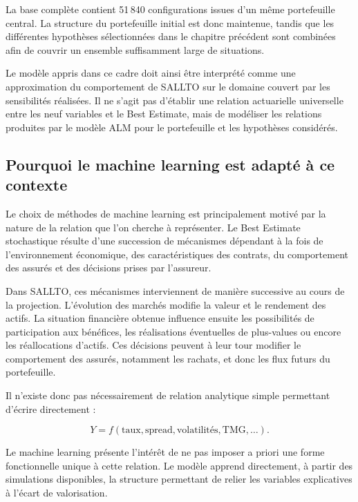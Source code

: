 La base complète contient 51\,840 configurations issues d'un même portefeuille central. La structure du portefeuille initial est donc maintenue, tandis que les différentes hypothèses sélectionnées dans le chapitre précédent sont combinées afin de couvrir un ensemble suffisamment large de situations.

Le modèle appris dans ce cadre doit ainsi être interprété comme une approximation du comportement de SALLTO sur le domaine couvert par les sensibilités réalisées. Il ne s'agit pas d'établir une relation actuarielle universelle entre les neuf variables et le Best Estimate, mais de modéliser les relations produites par le modèle ALM pour le portefeuille et les hypothèses considérés.


\subsection{Pourquoi le machine learning est adapté à ce contexte}

Le choix de méthodes de machine learning est principalement motivé par la nature de la relation que l'on cherche à représenter. Le Best Estimate stochastique résulte d'une succession de mécanismes dépendant à la fois de l'environnement économique, des caractéristiques des contrats, du comportement des assurés et des décisions prises par l'assureur.

Dans SALLTO, ces mécanismes interviennent de manière successive au cours de la projection. L'évolution des marchés modifie la valeur et le rendement des actifs. La situation financière obtenue influence ensuite les possibilités de participation aux bénéfices, les réalisations éventuelles de plus-values ou encore les réallocations d'actifs. Ces décisions peuvent à leur tour modifier le comportement des assurés, notamment les rachats, et donc les flux futurs du portefeuille.

Il n'existe donc pas nécessairement de relation analytique simple permettant d'écrire directement :

\begin{equation}
    Y =
    f(
    \text{taux},
    \text{spread},
    \text{volatilités},
    \text{TMG},
    \ldots
    ).
\end{equation}

Le machine learning présente l'intérêt de ne pas imposer a priori une forme fonctionnelle unique à cette relation. Le modèle apprend directement, à partir des simulations disponibles, la structure permettant de relier les variables explicatives à l'écart de valorisation.

